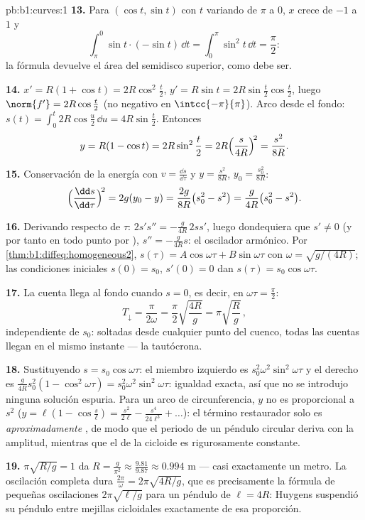 \begin{solution}{pb:b1:curves:1}
\textbf{13.} Para $(\cos t, \sin t)$ con $t$ variando de $\pi$ a $0$,
$x$ crece de $-1$ a $1$ y
\[
\int_\pi^0 \sin t\cdot(-\sin t)\,\dd t
= \int_0^\pi \sin^2 t\,\dd t = \frac\pi2 :
\]
la fórmula devuelve el área del semidisco superior, como debe ser.

\textbf{14.} $x' = R(1 + \cos t) = 2R\cos^2\frac t2$, $y' =
R\sin t = 2R\sin\frac t2\cos\frac t2$, luego $\norm{f'} =
2R\cos\frac t2$ (no negativo en $\intcc{-\pi}{\pi}$). Arco desde
el fondo: $s(t) = \int_0^t 2R\cos\frac u2\,\dd u =
4R\sin\frac t2$. Entonces
\[
y = R(1 - \cos t) = 2R\sin^2\frac t2
= 2R\Bigl(\frac{s}{4R}\Bigr)^{\!2} = \frac{s^2}{8R} .
\]

\textbf{15.} Conservación de la energía con $v = \frac{\dd s}{\dd\tau}$
y $y = \frac{s^2}{8R}$, $y_0 = \frac{s_0^2}{8R}$:
\[
\Bigl(\frac{\dd s}{\dd\tau}\Bigr)^{\!2} = 2g(y_0 - y)
= \frac{2g}{8R}\bigl(s_0^2 - s^2\bigr)
= \frac{g}{4R}\bigl(s_0^2 - s^2\bigr).
\]

\textbf{16.} Derivando respecto de $\tau$: $2s's'' =
-\frac{g}{4R}\,2ss'$, luego dondequiera que $s' \neq 0$ (y por tanto en todo punto
por ), $s'' = -\frac{g}{4R}s$: el oscilador armónico.
Por \cref{thm:b1:diffeq:homogeneous2}, $s(\tau) =
A\cos\omega\tau + B\sin\omega\tau$ con $\omega =
\sqrt{g/(4R)}$; las condiciones iniciales $s(0) = s_0$, $s'(0) = 0$
dan $s(\tau) = s_0\cos\omega\tau$.

\textbf{17.} La cuenta llega al fondo cuando $s = 0$, es decir, en
$\omega\tau = \frac\pi2$:
\[
T_{\downarrow} = \frac{\pi}{2\omega}
= \frac\pi2\sqrt{\frac{4R}{g}} = \pi\sqrt{\frac Rg}\,,
\]
independiente de $s_0$: soltadas desde cualquier punto del cuenco, todas
las cuentas llegan en el mismo instante --- la tautócrona.

\textbf{18.} Sustituyendo $s = s_0\cos\omega\tau$: el miembro izquierdo
es $s_0^2\omega^2\sin^2\omega\tau$ y el derecho es
$\frac{g}{4R}s_0^2(1 - \cos^2\omega\tau) =
s_0^2\omega^2\sin^2\omega\tau$: igualdad exacta, así que no se introdujo
ninguna solución espuria. Para un arco de circunferencia, $y$ no es
proporcional a $s^2$ ($y = \ell(1 - \cos\frac s\ell) =
\frac{s^2}{2\ell} - \frac{s^4}{24\ell^3} + \dots$): el
término restaurador solo es \emph{aproximadamente} , de modo que el
periodo de un péndulo circular deriva con la amplitud, mientras que el de la
cicloide es rigurosamente constante.

\textbf{19.} $\pi\sqrt{R/g} = 1$ da $R = \frac{g}{\pi^2}
\approx \frac{9.81}{9.87} \approx 0.994$ m --- casi exactamente
un metro. La oscilación completa dura $\frac{2\pi}\omega =
2\pi\sqrt{4R/g}$, que es precisamente la fórmula de pequeñas oscilaciones
$2\pi\sqrt{\ell/g}$ para un péndulo de  $\ell = 4R$:
Huygens suspendió su péndulo entre mejillas cicloidales exactamente de
esa proporción.


\end{solution}
